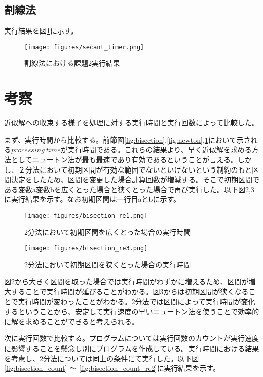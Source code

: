 \documentclass[uplatex]{jsarticle}
\begin{document}
\subsection{割線法}
実行結果を図\ref{fig:secant}に示す。
\begin{figure}[ht]
  \centering
   \texttt{[image: figures/secant\_timer.png]}
   \caption{割線法における課題2実行結果}
   \label{fig:secant}
\end{figure}

\section{考察}
近似解への収束する様子を処理に対する実行時間と実行回数によって比較した。

まず、実行時間から比較する。前節図\ref{fig:bisection},\ref{fig:newton},\ref{fig:secant}において示される$processing\ time$が実行時間である。これらの結果より、早く近似解を求める方法としてニュートン法が最も最速であり有効であるということが言える。しかし、２分法において初期区間が有効な範囲でないといけないという制約のもと区間決定をしたため、区間を変更した場合計算回数が増減する。そこで初期区間である変数a変数bを広くとった場合と狭くとった場合で再び実行した。以下図\ref{fig:bisection_re1},\ref{fig:bisection_re2}に実行結果を示す。なお初期区間は一行目aとbに示す。

\begin{figure}[ht]
  \centering
   \texttt{[image: figures/bisection\_re1.png]}
   \caption{2分法において初期区間を広くとった場合の実行時間}
   \label{fig:bisection_re1}
\end{figure}

\begin{figure}[ht]
  \centering
   \texttt{[image: figures/bisection\_re3.png]}
   \caption{2分法において初期区間を狭くとった場合の実行時間}
   \label{fig:bisection_re2}
\end{figure}

図\ref{fig:bisection_re1}から大きく区間を取った場合では実行時間がわずかに増えるため、区間が増大することで実行時間が延びることがわかる。図\ref{fig:bisection_re2}からは初期区間が狭くなることで実行時間が変わったことがわかる。2分法では区間によって実行時間が変化するということから、安定して実行速度の早いニュートン法を使うことで効率的に解を求めることができると考えられる。

次に実行回数で比較する。プログラムについては実行回数のカウントが実行速度に影響することを懸念し別にプログラムを作成している。実行時間における結果を考慮し、2分法については同上の条件にて実行した。以下図\ref{fig:bisection_count} ～ \ref{fig:bisection_count_re2}に実行結果を示す。
\end{document}
